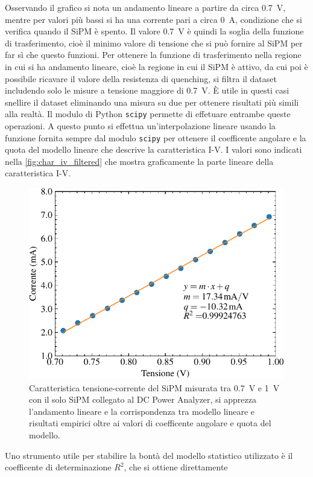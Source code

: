 Osservando il grafico si nota un andamento lineare a partire da circa \SI{0,7}{\volt}, mentre per valori più bassi si ha
una corrente pari a circa \SI{0}{\ampere}, condizione che si verifica quando il SiPM è spento. Il valore \SI{0,7}{\volt} è quindi la 
soglia della funzione di trasferimento, cioè il minimo valore di tensione che si può fornire al SiPM per far sì che questo funzioni. 
Per ottenere la funzione di trasferimento nella regione in cui si ha andamento lineare, cioè la regione in cui il SiPM è attivo, da cui poi 
è possibile ricavare il valore della resistenza di quenching, si filtra il dataset includendo solo le misure a tensione maggiore di \SI{0,7}{\volt}. 
È utile in questi casi snellire il dataset eliminando una misura su due per ottenere risultati più simili alla realtà.
Il modulo di Python \texttt{scipy} permette di effetuare entrambe queste operazioni. A questo punto si effettua un'interpolazione lineare 
usando la funzione fornita sempre dal modulo \texttt{scipy} per ottenere il coefficente angolare e la quota del modello lineare che descrive la 
caratteristica I-V. I valori sono indicati nella \autoref*{fig:char_iv_filtered} che mostra graficamente la parte lineare della
caratteristica I-V.
\begin{figure}[h!]
    \centering
    \includegraphics[width=.75\linewidth]{img/char_IV_filtered.pdf}
    \caption{Caratteristica tensione-corrente del SiPM misurata tra \SI{0,7}{\volt} e \SI{1}{\volt} con il solo SiPM collegato al DC Power Analyzer, si apprezza l'andamento lineare e la corrispondenza tra modello lineare e risultati empirici oltre ai valori di coefficente angolare e quota del modello.}
    \label{fig:char_iv_filtered}
\end{figure}
Uno strumento utile per stabilire la bontà del modello statistico utilizzato è il coefficente di determinazione $R^2$, che si ottiene direttamente
